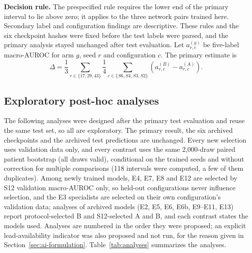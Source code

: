 \textbf{Decision rule.} The prespecified rule requires the lower end of the primary interval to lie above zero; it applies to the three network pairs trained here. Secondary label and configuration findings are descriptive. These rules and the six checkpoint hashes were fixed before the test labels were parsed, and the primary analysis stayed unchanged after test evaluation. Let $a^{(g)}_{r,c}$ be five-label macro-AUROC for arm $g$, seed $r$ and configuration $c$. The primary estimate is
\begin{equation}
\Delta=\frac{1}{3}\sum_{r\in\{17,29,43\}}\frac{1}{4}
\sum_{c\in\{S6,S4,S3,S2\}}\left(a^{(B)}_{r,c}-a^{(A)}_{r,c}\right).
\end{equation}

\subsection{Exploratory post-hoc analyses}
\label{sec:posthoc}

The following analyses were designed after the primary test evaluation and reuse the same test set, so all are exploratory. The primary result, the six archived checkpoints and the archived test predictions are unchanged. Every new selection uses validation data only, and every contrast uses the same 2,000-draw paired patient bootstrap (all draws valid), conditional on the trained seeds and without correction for multiple comparisons (118 intervals were computed, a few of them duplicates). Among newly trained models, E4, E7, E8 and E12 are selected by S12 validation macro-AUROC only, so held-out configurations never influence selection, and the E3 specialists are selected on their own configuration's validation data; analyses of archived models (E2, E5, E6, E6b, E9--E11, E13) report protocol-selected B and S12-selected A and B, and each contrast states the models used. Analyses are numbered in the order they were proposed; an explicit lead-availability indicator was also proposed and not run, for the reason given in Section~\ref{sec:ai-formulation}. Table~\ref{tab:analyses} summarizes the analyses.

